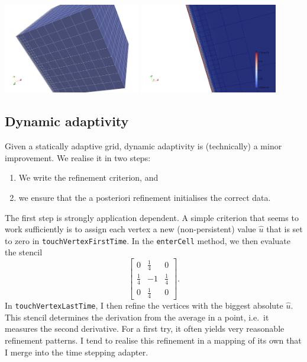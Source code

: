 \begin{center}
 \includegraphics[width=0.45\textwidth]{41_heat-equation/initial-adaptive-grid.png}
 \includegraphics[width=0.45\textwidth]{41_heat-equation/adaptive-grid-21.png}
\end{center}



\subsection{Dynamic adaptivity}

Given a statically adaptive grid, dynamic adaptivity is (technically) a minor
improvement. 
We realise it in two steps:
\begin{enumerate}
  \item We write the refinement criterion, and 
  \item we ensure that the a posteriori refinement initialises the correct data.
\end{enumerate}

The first step is strongly application dependent. 
A simple criterion that seems to work sufficiently is to assign each vertex a
new (non-persistent) value $\hat u$ that is set to zero in
\texttt{touchVertexFirstTime}. In the \texttt{enterCell} method, we then
evaluate the stencil
\[
\left[ \begin{array}{ccc}
  0 & \frac{1}{4} & 0 \\
  \frac{1}{4} & -1 & \frac{1}{4} \\
  0 & \frac{1}{4} & 0
\end{array}  \right].
\]
In \texttt{touchVertexLastTime}, I then refine the vertices with the biggest
absolute $\hat u$. This stencil determines the derivation from the
average in a point, i.e.~it measures the second derivative.
For a first try, it often yields very reasonable refinement patterns.
I tend to realise this refinement in a mapping of its own that I merge into the
time stepping adapter.

